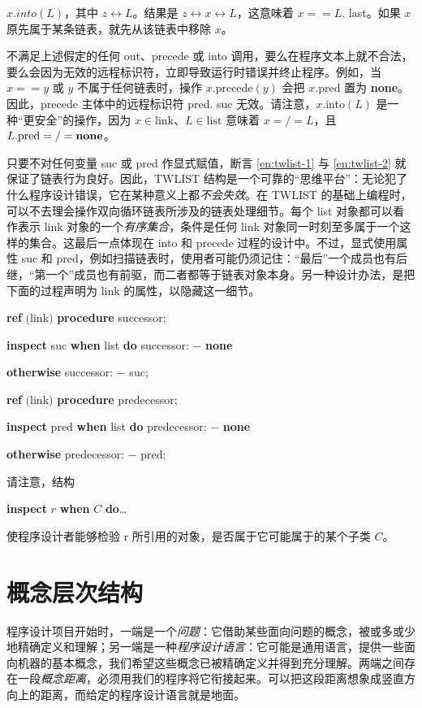\documentclass[twoside,11pt,fontset=none]{ctexbook}
\begin{document}
\noindent
$x.into(L)$，其中 $z \leftrightarrow L$。结果是 $z \leftrightarrow x \leftrightarrow L$，这意味着 $x == L$. last。如果 $x$ 原先属于某条链表，就先从该链表中移除 $x$。

不满足上述假定的任何 out、precede 或 into 调用，要么在程序文本上就不合法，要么会因为无效的远程标识符，立即导致运行时错误并终止程序。例如，当 $x == y$ 或 $y$ 不属于任何链表时，操作 $x$.precede$(y)$ 会把 $x$.pred 置为 \textbf{none}。因此，precede 主体中的远程标识符 pred. suc 无效。请注意，$x$.into$(L)$ 是一种“更安全”的操作，因为 $x \in \text{link}$、$L \in \text{list}$ 意味着 $x =/= L$，且 $L.\text{pred} =/= \text{\textbf{none}}$。

只要不对任何变量 suc 或 pred 作显式赋值，断言 \ref{en:twlist-1} 与 \ref{en:twlist-2} 就保证了链表行为良好。因此，TWLIST 结构是一个可靠的“思维平台”：无论犯了什么程序设计错误，它在某种意义上都\textit{不会失效}。在 TWLIST 的基础上编程时，可以不去理会操作双向循环链表所涉及的链表处理细节。每个 list 对象都可以看作表示 link 对象的一个\textit{有序集合}，条件是任何 link 对象同一时刻至多属于一个这样的集合。这最后一点体现在 into 和 precede 过程的设计中。不过，显式使用属性 suc 和 pred，例如扫描链表时，使用者可能仍须记住：“最后”一个成员也有后继，“第一个”成员也有前驱，而二者都等于链表对象本身。另一种设计办法，是把下面的过程声明为 link 的属性，以隐藏这一细节。

\quad \textbf{ref} $($link$)$ \textbf{procedure} successor;

\quad \quad \textbf{inspect} suc \textbf{when} list \textbf{do} successor: $-$ \textbf{none}

\quad \quad \textbf{otherwise} successor: $-$ suc;

\quad \textbf{ref} $($link$)$ \textbf{procedure} predecessor;

\quad \quad \textbf{inspect} pred \textbf{when} list \textbf{do} predecessor: $-$ \textbf{none}

\quad \quad \textbf{otherwise} predecessor: $-$ pred;

请注意，结构

\quad \textbf{inspect} $r$ \textbf{when} $C$ \textbf{do}\dots

\noindent
使程序设计者能够检验 r 所引用的对象，是否属于它可能属于的某个子类 $C$。

\section{概念层次结构}

程序设计项目开始时，一端是一个\textit{问题}：它借助某些面向问题的概念，被或多或少地精确定义和理解；另一端是一种\textit{程序设计语言}：它可能是通用语言，提供一些面向机器的基本概念，我们希望这些概念已被精确定义并得到充分理解。两端之间存在一段\textit{概念距离}，必须用我们的程序将它衔接起来。可以把这段距离想象成竖直方向上的距离，而给定的程序设计语言就是地面。
\end{document}
